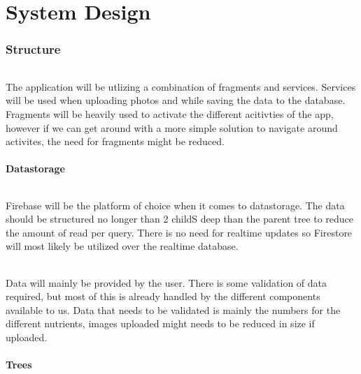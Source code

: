 \documentclass{article}
\begin{document}
\part{System Design}
\section{Structure}
    \paragraph{}
    The application will be utlizing a combination of fragments and services. Services will be used when uploading photos and while saving the data to the database. 
    Fragments will be heavily used to activate the different acitivties of the app, however if we can get around with a more simple solution to navigate around activites,
    the need for fragments might be reduced.

    \hfill \break
    \hfill \break

    \subsection{Datastorage}
        \paragraph{}
        Firebase will be the platform of choice when it comes to datastorage. The data should be structured no longer than 2 childS deep than the parent tree to reduce the amount of read per query.
        There is no need for realtime updates so Firestore will most likely be utilized over the realtime database.

        \paragraph{}
        Data will mainly be provided by the user. There is some validation of data required, but most of this is already handled by the different components available to us. 
        Data that needs to be validated is mainly the numbers for the different nutrients, images uploaded might needs to be reduced in size if uploaded.

    \hfill \break
    \hfill \break
    
    \subsection{Trees}
\end{document}
